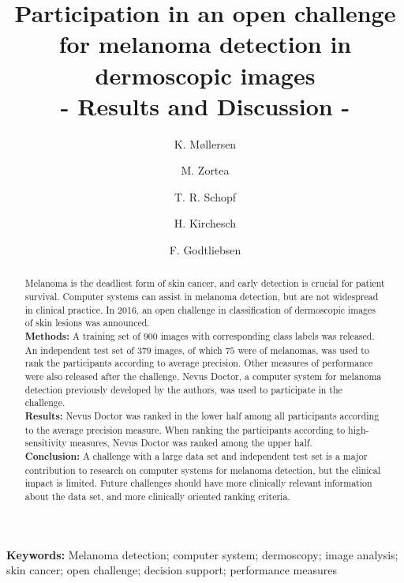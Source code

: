 \documentclass[a4paper,12pt]{article}
\begin{document}
\author[1,*]{\footnotesize K. M{\o}llersen} 
\author[2]{M. Zortea}
\author[3]{T. R. Schopf}
\author[4]{H. Kirchesch}
\author[2]{F. Godtliebsen}




\title{Participation in an open challenge for melanoma detection in dermoscopic images \\
- Results and Discussion - }
\date{}

\maketitle

{\bf Keywords:} Melanoma detection; computer system; dermoscopy; image analysis; skin cancer; open challenge; decision support; performance measures

\begin{abstract}
 Melanoma is the deadliest form of skin cancer, and early detection is crucial for patient survival. Computer systems can assist in melanoma detection, but are not widespread in clinical practice. In 2016, an open challenge in classification of dermoscopic images of skin lesions was announced.  \\ 
{\bf Methods:} A training set of $900$ images with corresponding class labels was released. An independent test set of $379$ images, of which $75$ were of melanomas, was used to rank the participants according to average precision. Other measures of performance were also released after the challenge. Nevus Doctor, a computer system for melanoma detection previously developed by the authors, was used to participate in the challenge.  \\
{\bf Results:} Nevus Doctor was ranked in the lower half among all participants according to the average precision measure. When ranking the participants according to high-sensitivity measures, Nevus Doctor was ranked among the upper half. \\ 
{\bf Conclusion:} A challenge with a large data set and independent test set is a major contribution to research on computer systems for melanoma detection, but the clinical impact is limited. Future challenges should have more clinically relevant information about the data set, and more clinically oriented ranking criteria. 
\end{abstract}
\end{document}
